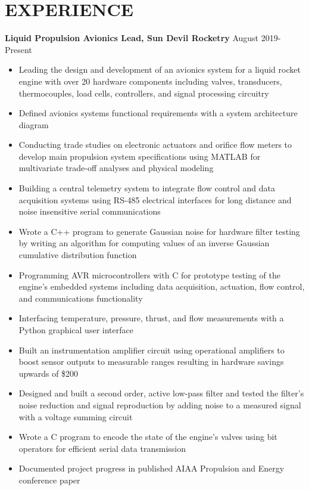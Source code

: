 \documentclass{article}
\begin{document}
\section{EXPERIENCE}
\textbf{Liquid Propulsion Avionics Lead, Sun Devil Rocketry}
\hfill
\vspace{0.5em}
August 2019-Present
\begin{itemize}
	\item{Leading the design and development of an avionics system for a liquid rocket engine with over 20 hardware components including valves, transducers, thermocouples, load cells, controllers, and signal processing circuitry}
	\item{Defined avionics systems functional requirements with a system architecture diagram}
	\item{Conducting trade studies on electronic actuators and orifice flow meters to develop main propulsion system specifications using MATLAB for multivariate trade-off analyses and physical modeling}
	\item{Building a central telemetry system to integrate flow control and data acquisition systems using RS-485 electrical interfaces for long distance and noise insensitive serial communications}
	\item{Wrote a C++ program to generate Gaussian noise for hardware filter testing by writing an algorithm for computing values of an inverse Gaussian cumulative distribution function}
	\item{Programming AVR microcontrollers with C for prototype testing of the engine's embedded systems including data acquisition, actuation, flow control, and communications functionality}
	\item{Interfacing temperature, pressure, thrust, and flow measurements with a Python graphical user interface}
	\item{Built an instrumentation amplifier circuit using operational amplifiers to boost sensor outputs to measurable ranges resulting in hardware savings upwards of \$200}
	\item{Designed and built a second order, active low-pass filter and tested the filter's noise reduction and signal reproduction by adding noise to a measured signal with a voltage summing circuit}
	\item{Wrote a C program to encode the state of the engine's valves using bit operators for efficient serial data transmission}
	\item{Documented project progress in published AIAA Propulsion and Energy conference paper}
\end{itemize}
\end{document}
